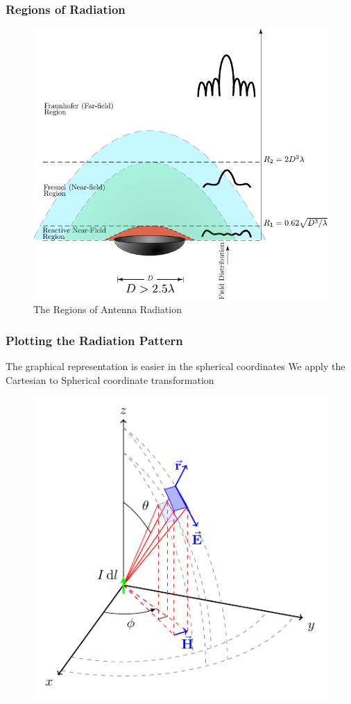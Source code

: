 \documentclass[10pt, compress]{beamer}
\begin{document}
\begin{frame}
  \frametitle{Regions of Radiation}
      \begin{figure}[t!]
      \centering
          \includegraphics[width=.7\textwidth]{src/antenna_rregions.pdf}
      \caption{The Regions of Antenna Radiation}
    \end{figure}
\end{frame}


\begin{frame}
  \frametitle{Plotting the Radiation Pattern}
  \begin{outline}
    \1 The graphical representation is easier in the spherical coordinates
    \1 We apply the Cartesian to Spherical coordinate transformation
  \end{outline}
\begin{figure}
  \centering
  \includegraphics[width=.6\textwidth]{3dcoord.pdf}
\end{figure}
\end{frame}
\end{document}
